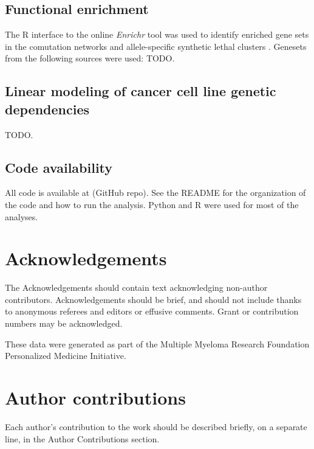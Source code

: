 \documentclass[english, 12pt, letterpaper]{article}
\begin{document}
\subsection*{Functional enrichment}
The R interface to the online \emph{Enrichr} tool was used to identify enriched gene sets in the comutation networks and allele-specific synthetic lethal clusters \cite{Chen2013, Kuleshov2016Enrichr:Update., R-enrichR}.
Genesets from the following sources were used: TODO.

\subsection*{Linear modeling of cancer cell line genetic dependencies}
TODO.





\subsection{}


\subsection*{Code availability}

All code is available at (GitHub repo).
See the README for the organization of the code and how to run the analysis.
Python \cite{van1995python} and R \cite{Rlang} were used for most of the analyses.



\section*{Acknowledgements}

The Acknowledgements should contain text acknowledging non-author contributors.
Acknowledgements should be brief, and should not include thanks to anonymous referees and editors or effusive comments.
Grant or contribution numbers may be acknowledged.

These data were generated as part of the Multiple Myeloma Research Foundation Personalized Medicine Initiative.

\section*{Author contributions}

Each author’s contribution to the work should be described briefly, on a separate line, in the Author Contributions section. 
\end{document}
